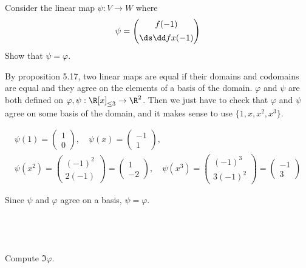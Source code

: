 \documentclass[a4paper]{article}
\begin{document}
\subsection{~} %

\begin{questionbody}
Consider the linear map $\psi : V \to W$ where $$\psi = \begin{pmatrix} f(-1) \\[1ex] \ds \dd fx (-1) \end{pmatrix}$$
Show that $\psi = \varphi$.
\end{questionbody}

By proposition 5.17, two linear maps are equal if their domains and codomains are equal and they agree on the elements of a basis of the domain. $\varphi$ and $\psi$ are both defined on $\varphi, \psi : \R[x]_{\le 3} \to \R^2$. Then we just have to check that $\varphi$ and $\psi$ agree on some basis of the domain, and it makes sense to use $\{ 1, x, x^2, x^3 \}$.

\begin{gather*}
\psi(1) = \begin{pmatrix}1\\ 0\end{pmatrix},\quad
\psi(x) = \begin{pmatrix}-1\\ 1\end{pmatrix},\quad\\[1ex]
\psi(x^2) = \begin{pmatrix}(-1)^2\\ 2(-1)\end{pmatrix} = \begin{pmatrix}1\\ -2\end{pmatrix},\quad
\psi(x^3) = \begin{pmatrix}(-1)^3\\ 3(-1)^2\end{pmatrix} = \begin{pmatrix}-1\\ 3\end{pmatrix}
\end{gather*}

Since $\psi$ and $\varphi$ agree on a basis, $\psi = \varphi$.

\subsection{~} %

\begin{questionbody}
Compute $\Im \varphi$.
\end{questionbody}
\end{document}
